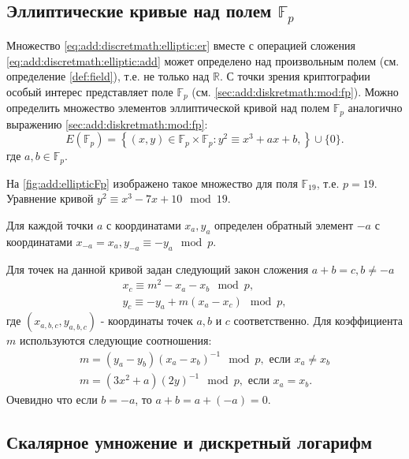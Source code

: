 \subsection{Эллиптические кривые над полем $\mathbb{F}_p$}
Множество \eqref{eq:add:discretmath:elliptic:er} вместе с операцией
сложения \eqref{eq:add:discretmath:elliptic:add} может определено над
произвольным полем (см. определение \ref{def:field}), 
т.е. не только над $\mathbb{R}$. С точки зрения
криптографии особый интерес представляет поле $\mathbb{F}_p$ (см.
\autoref{sec:add:diskretmath:mod:fp}). Можно определить множество
элементов эллиптической кривой над полем $\mathbb{F}_p$ аналогично
выражению \eqref{sec:add:diskretmath:mod:fp}:
\begin{equation}
E\left(\mathbb{F}_p\right) = \left\{ (x,y) \in 
\mathbb{F}_p \times \mathbb{F}_p: 
y^2 \equiv x^3 +ax +b, 
\right\} \cup \{0\}.
\label{eq:add:discretmath:elliptic:fp}
\end{equation}
где $a,b \in \mathbb{F}_p$.



На \autoref{fig:add:ellipticFp} изображено такое множество для поля
$\mathbb{F}_{19}$, т.е. $p = 19$. Уравнение кривой $y^2 \equiv x^3 -7
x + 10 \mod 19$. 

Для каждой точки $a$ с координатами $x_a, y_a$ определен обратный
элемент $-a$ с координатами $x_{-a} = x_a, y_{-a} \equiv -y_a \mod p$.

Для точек на данной кривой задан следующий закон сложения $a + b = c,
b \ne -a$
\begin{eqnarray}
x_{c} \equiv m^2 - x_a - x_b \mod p,
\nonumber \\
y_{c} \equiv - y_a + m \left(x_a - x_c\right) \mod p,
\label{eq:add:discretmath:elliptic:addfp}
\end{eqnarray}
где $(x_{a,b,c}, y_{a,b,c})$ - координаты точек $a,b$ и $c$
соответственно. Для коэффициента $m$ используются следующие
соотношения: 
\begin{eqnarray}
m = \left(y_a - y_b\right)\left(x_a - x_b\right)^{-1} \mod p, \mbox{ если } x_a \ne x_b
\nonumber \\
m = \left(3x^2 + a\right)\left(2y\right)^{-1} \mod p, \mbox{ если }
x_a = x_b.
\nonumber
\end{eqnarray}
Очевидно что если $b = -a$, то $a + b = a + (-a) = 0$.

\subsection{Скалярное умножение и дискретный логарифм}

